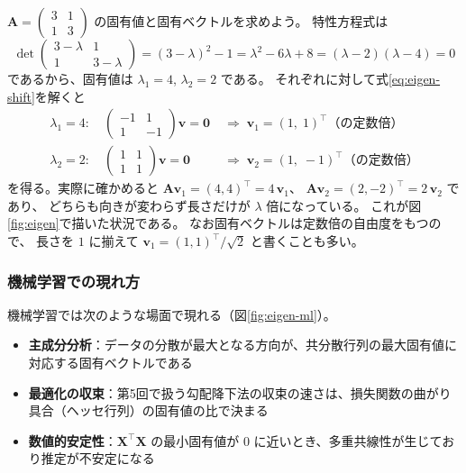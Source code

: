 
$\bm{A} = \begin{pmatrix} 3 & 1 \\ 1 & 3 \end{pmatrix}$ の固有値と固有ベクトルを求めよう。
特性方程式は
\begin{equation*}
  \det\!\begin{pmatrix} 3 - \lambda & 1 \\ 1 & 3 - \lambda \end{pmatrix}
  = (3 - \lambda)^2 - 1 = \lambda^2 - 6\lambda + 8 = (\lambda - 2)(\lambda - 4) = 0
\end{equation*}
であるから、固有値は $\lambda_1 = 4$, $\lambda_2 = 2$ である。
それぞれに対して式\eqref{eq:eigen-shift}を解くと
\begin{align*}
  \lambda_1 = 4:\quad
    \begin{pmatrix} -1 & 1 \\ 1 & -1 \end{pmatrix}\bm{v} = \bm{0}
    &\;\Rightarrow\; \bm{v}_1 = (1,\; 1)^\top \text{（の定数倍）} \\
  \lambda_2 = 2:\quad
    \begin{pmatrix} 1 & 1 \\ 1 & 1 \end{pmatrix}\bm{v} = \bm{0}
    &\;\Rightarrow\; \bm{v}_2 = (1,\; -1)^\top \text{（の定数倍）}
\end{align*}
を得る。実際に確かめると
$\bm{A}\bm{v}_1 = (4, 4)^\top = 4\,\bm{v}_1$、
$\bm{A}\bm{v}_2 = (2, -2)^\top = 2\,\bm{v}_2$ であり、
どちらも向きが変わらず長さだけが $\lambda$ 倍になっている。
これが図\ref{fig:eigen}で描いた状況である。
なお固有ベクトルは定数倍の自由度をもつので、
長さを $1$ に揃えて $\bm{v}_1 = (1,1)^\top/\sqrt{2}$ と書くことも多い。

\subsubsection{機械学習での現れ方}

機械学習では次のような場面で現れる（図\ref{fig:eigen-ml}）。
\begin{itemize}
  \item \textbf{主成分分析}：データの分散が最大となる方向が、共分散行列の最大固有値に対応する固有ベクトルである
  \item \textbf{最適化の収束}：第5回で扱う勾配降下法の収束の速さは、損失関数の曲がり具合（ヘッセ行列）の固有値の比で決まる
  \item \textbf{数値的安定性}：$\bm{X}^\top \bm{X}$ の最小固有値が $0$ に近いとき、多重共線性が生じており推定が不安定になる
\end{itemize}

